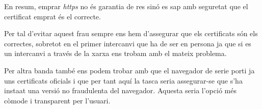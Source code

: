 \documentclass[a4paper,11pt]{scrartcl}
\begin{document}
En resum, emprar \emph{https} no és garantia de res sinó es sap amb seguretat que el certificat emprat
és el correcte.

Per tal d'evitar aquest frau sempre ens hem d'assegurar que els certificats són els correctes,
sobretot en el primer intercanvi que ha de ser en persona ja que si es un intercanvi a través de
la xarxa ens trobam amb el mateix problema.

Per altra banda també ens podem trobar amb que el navegador de serie porti ja uns certificats oficials
i que per tant aquí la tasca seria assegurar-se que s'ha insta\lgem at una versió no fraudulenta del
navegador. Aquesta seria l'opció més còmode i transparent per l'usuari.




\end{document}
